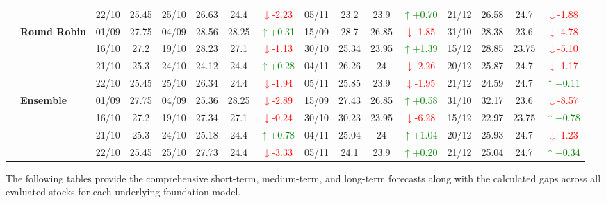\documentclass{ieeeaccess}
\begin{document}
{\begin{longtable}{llcc|cccc|cccc|cccc}
&
& 22/10 & 25.45 & 25/10 & 26.63 & 24.4 & \textcolor{red}{\(\downarrow\)-2.23} & 05/11 & 23.2 & 23.9 & \textcolor{green}{\(\uparrow\)+0.70} & 21/12 & 26.58 & 24.7 & \textcolor{red}{\(\downarrow\)-1.88} \\
\cmidrule(lr){2-16}


& \textbf{Round Robin}
& 01/09 & 27.75 & 04/09 & 28.56 & 28.25 & \textcolor{green}{\(\uparrow\)+0.31} & 15/09 & 28.7 & 26.85 & \textcolor{red}{\(\downarrow\)-1.85} & 31/10 & 28.38 & 23.6 & \textcolor{red}{\(\downarrow\)-4.78} \\

&
& 16/10 & 27.2 & 19/10 & 28.23 & 27.1 & \textcolor{red}{\(\downarrow\)-1.13} & 30/10 & 25.34 & 23.95 & \textcolor{green}{\(\uparrow\)+1.39} & 15/12 & 28.85 & 23.75 & \textcolor{red}{\(\downarrow\)-5.10} \\

&
& 21/10 & 25.3 & 24/10 & 24.12 & 24.4 & \textcolor{green}{\(\uparrow\)+0.28} & 04/11 & 26.26 & 24 & \textcolor{red}{\(\downarrow\)-2.26} & 20/12 & 25.87 & 24.7 & \textcolor{red}{\(\downarrow\)-1.17} \\

&
& 22/10 & 25.45 & 25/10 & 26.34 & 24.4 & \textcolor{red}{\(\downarrow\)-1.94} & 05/11 & 25.85 & 23.9 & \textcolor{red}{\(\downarrow\)-1.95} & 21/12 & 24.59 & 24.7 & \textcolor{green}{\(\uparrow\)+0.11} \\
\cmidrule(lr){2-16}



& \textbf{Ensemble}
& 01/09 & 27.75 & 04/09 & 25.36 & 28.25 & \textcolor{red}{\(\downarrow\)-2.89} & 15/09 & 27.43 & 26.85 & \textcolor{green}{\(\uparrow\)+0.58} & 31/10 & 32.17 & 23.6 & \textcolor{red}{\(\downarrow\)-8.57} \\

&
& 16/10 & 27.2 & 19/10 & 27.34 & 27.1 & \textcolor{red}{\(\downarrow\)-0.24} & 30/10 & 30.23 & 23.95 & \textcolor{red}{\(\downarrow\)-6.28} & 15/12 & 22.97 & 23.75 & \textcolor{green}{\(\uparrow\)+0.78} \\

&
& 21/10 & 25.3 & 24/10 & 25.18 & 24.4 & \textcolor{green}{\(\uparrow\)+0.78} & 04/11 & 25.04 & 24 & \textcolor{green}{\(\uparrow\)+1.04} & 20/12 & 25.93 & 24.7 & \textcolor{red}{\(\downarrow\)-1.23} \\

&
& 22/10 & 25.45 & 25/10 & 27.73 & 24.4 & \textcolor{red}{\(\downarrow\)-3.33} & 05/11 & 24.1 & 23.9 & \textcolor{green}{\(\uparrow\)+0.20} & 21/12 & 25.04 & 24.7 & \textcolor{green}{\(\uparrow\)+0.34} \\


\bottomrule
\end{longtable}
}
The following tables provide the comprehensive short-term, medium-term, and long-term forecasts along with the calculated gaps across all evaluated stocks for each underlying foundation model.
\end{document}
